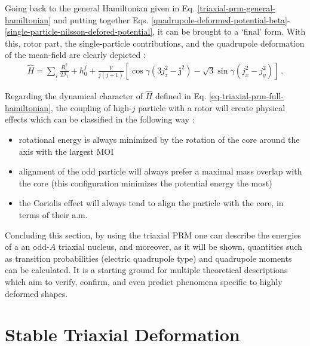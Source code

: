 Going back to the general Hamiltonian given in Eq. \ref{triaxial-prm-general-hamiltonian} and putting together Eqs. \ref{quadrupole-deformed-potential-beta}-\ref{single-particle-nilsson-defored-potential}, it can be brought to a `final' form. With this, rotor part, the single-particle contributions, and the quadrupole deformation of the mean-field are clearly depicted \cite{ring2004nuclear}:
\begin{align}
    \hat{H}=\sum_i\frac{R_i^2}{2\mathcal{I}_i}+h_0^j+\frac{V}{j(j+1)}\left[\cos\gamma(3j_z^2-\mathbf{j}^2)-\sqrt{3}\sin\gamma(j_x^2-j_y^2)\right]\ .
    \label{eq-triaxial-prm-full-hamiltonian}
\end{align}

Regarding the dynamical character of $\hat{H}$ defined in Eq. \ref{eq-triaxial-prm-full-hamiltonian}, the coupling of high-$j$ particle with a rotor will create physical effects which can be classified in the following way \cite{ring2004nuclear}:
\begin{itemize}
    \item rotational energy is always minimized by the rotation of the core around the axis with the largest MOI
    \item alignment of the odd particle will always prefer a maximal mass overlap with the core (this configuration minimizes the potential energy the most)
    \item the Coriolis effect will always tend to align the particle with the core, in terms of their a.m.
\end{itemize}

Concluding this section, by using the triaxial PRM one can describe the energies of a an odd-$A$ triaxial nucleus, and moreover, as it will be shown, quantities such as transition probabilities (electric quadrupole type) and quadrupole moments can be calculated. It is a starting ground for multiple theoretical descriptions which aim to verify, confirm, and even predict phenomena specific to highly deformed shapes.

\section{Stable Triaxial Deformation}
\label{potential-energy-surfaces-section}

